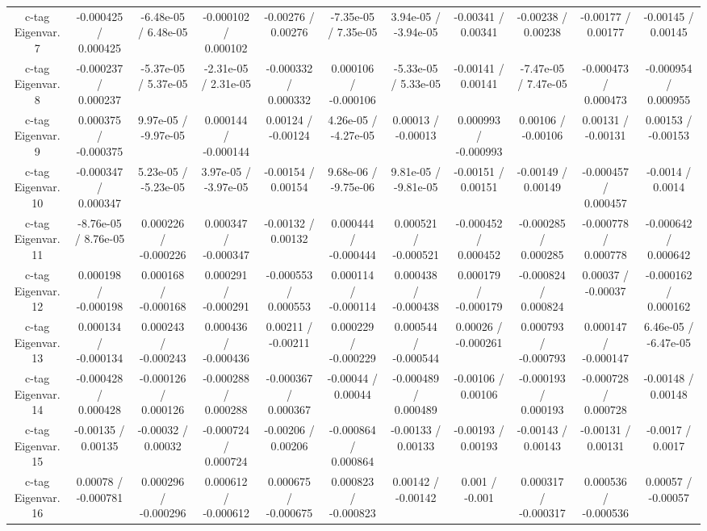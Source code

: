 \begin{table}[htbp]
\begin{center}
\begin{tabular}{|c|c|c|c|c|c|c|c|c|c|c|}
  c-tag Eigenvar. 7 & -0.000425 / 0.000425 & -6.48e-05 / 6.48e-05 & -0.000102 / 0.000102 & -0.00276 / 0.00276 & -7.35e-05 / 7.35e-05 & 3.94e-05 / -3.94e-05 & -0.00341 / 0.00341 & -0.00238 / 0.00238 & -0.00177 / 0.00177 & -0.00145 / 0.00145 \\ 
  c-tag Eigenvar. 8 & -0.000237 / 0.000237 & -5.37e-05 / 5.37e-05 & -2.31e-05 / 2.31e-05 & -0.000332 / 0.000332 & 0.000106 / -0.000106 & -5.33e-05 / 5.33e-05 & -0.00141 / 0.00141 & -7.47e-05 / 7.47e-05 & -0.000473 / 0.000473 & -0.000954 / 0.000955 \\ 
  c-tag Eigenvar. 9 & 0.000375 / -0.000375 & 9.97e-05 / -9.97e-05 & 0.000144 / -0.000144 & 0.00124 / -0.00124 & 4.26e-05 / -4.27e-05 & 0.00013 / -0.00013 & 0.000993 / -0.000993 & 0.00106 / -0.00106 & 0.00131 / -0.00131 & 0.00153 / -0.00153 \\ 
  c-tag Eigenvar. 10 & -0.000347 / 0.000347 & 5.23e-05 / -5.23e-05 & 3.97e-05 / -3.97e-05 & -0.00154 / 0.00154 & 9.68e-06 / -9.75e-06 & 9.81e-05 / -9.81e-05 & -0.00151 / 0.00151 & -0.00149 / 0.00149 & -0.000457 / 0.000457 & -0.0014 / 0.0014 \\ 
  c-tag Eigenvar. 11 & -8.76e-05 / 8.76e-05 & 0.000226 / -0.000226 & 0.000347 / -0.000347 & -0.00132 / 0.00132 & 0.000444 / -0.000444 & 0.000521 / -0.000521 & -0.000452 / 0.000452 & -0.000285 / 0.000285 & -0.000778 / 0.000778 & -0.000642 / 0.000642 \\ 
  c-tag Eigenvar. 12 & 0.000198 / -0.000198 & 0.000168 / -0.000168 & 0.000291 / -0.000291 & -0.000553 / 0.000553 & 0.000114 / -0.000114 & 0.000438 / -0.000438 & 0.000179 / -0.000179 & -0.000824 / 0.000824 & 0.00037 / -0.00037 & -0.000162 / 0.000162 \\ 
  c-tag Eigenvar. 13 & 0.000134 / -0.000134 & 0.000243 / -0.000243 & 0.000436 / -0.000436 & 0.00211 / -0.00211 & 0.000229 / -0.000229 & 0.000544 / -0.000544 & 0.00026 / -0.000261 & 0.000793 / -0.000793 & 0.000147 / -0.000147 & 6.46e-05 / -6.47e-05 \\ 
  c-tag Eigenvar. 14 & -0.000428 / 0.000428 & -0.000126 / 0.000126 & -0.000288 / 0.000288 & -0.000367 / 0.000367 & -0.00044 / 0.00044 & -0.000489 / 0.000489 & -0.00106 / 0.00106 & -0.000193 / 0.000193 & -0.000728 / 0.000728 & -0.00148 / 0.00148 \\ 
  c-tag Eigenvar. 15 & -0.00135 / 0.00135 & -0.00032 / 0.00032 & -0.000724 / 0.000724 & -0.00206 / 0.00206 & -0.000864 / 0.000864 & -0.00133 / 0.00133 & -0.00193 / 0.00193 & -0.00143 / 0.00143 & -0.00131 / 0.00131 & -0.0017 / 0.0017 \\ 
  c-tag Eigenvar. 16 & 0.00078 / -0.000781 & 0.000296 / -0.000296 & 0.000612 / -0.000612 & 0.000675 / -0.000675 & 0.000823 / -0.000823 & 0.00142 / -0.00142 & 0.001 / -0.001 & 0.000317 / -0.000317 & 0.000536 / -0.000536 & 0.00057 / -0.00057 \\ 

\end{tabular}
\end{center}
\end{table}
